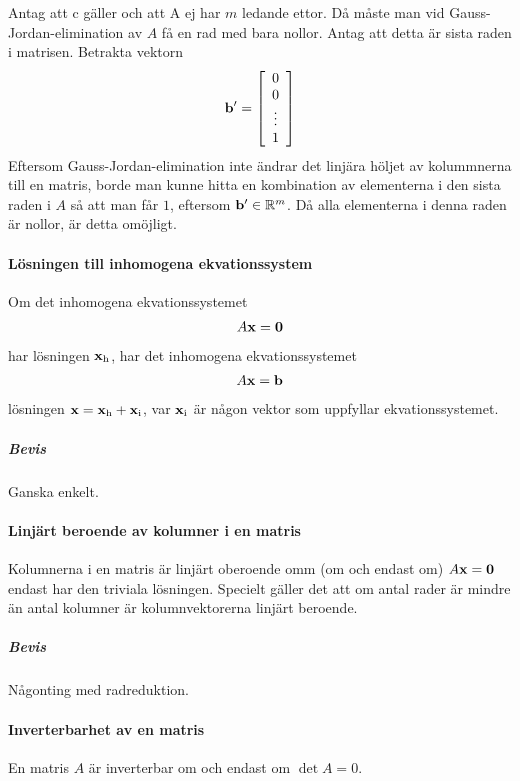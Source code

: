 Antag att c gäller och att A ej har $m$ ledande ettor. Då måste man vid Gauss-Jordan-elimination av $A$ få en rad med bara nollor. Antag att detta är sista raden i matrisen. Betrakta vektorn
\begin{align*}
	\vect{b}' =
	\left[\begin{array}{c}
    	0    \\
    	0    \\
    	\vdots \\
	    1
	\end{array}\right]
\end{align*}
Eftersom Gauss-Jordan-elimination inte ändrar det linjära höljet av kolummnerna till en matris, borde man kunne hitta en kombination av elementerna i den sista raden i $A$ så att man får $1$, eftersom $\vect{b}'\in\R^m$. Då alla elementerna i denna raden är nollor, är detta omöjligt.

\paragraph{Lösningen till inhomogena ekvationssystem}
Om det inhomogena ekvationssystemet
\begin{align*}
	A\vect{x} = \vect{0}
\end{align*}
har lösningen $\vect{x}_\text{h}$, har det inhomogena ekvationssystemet
\begin{align*}
	A\vect{x} = \vect{b}
\end{align*}
lösningen $\vect{x} = \vect{x}_\text{h} + \vect{x}_\text{i}$, var $\vect{x}_\text{i}$ är någon vektor som uppfyllar ekvationssystemet.

\subparagraph{Bevis}
Ganska enkelt.

\paragraph{Linjärt beroende av kolumner i en matris}
Kolumnerna i en matris är linjärt oberoende omm (om och endast om) $A\vect{x} = \vect{0}$ endast har den triviala lösningen. Specielt gäller det att om antal rader är mindre än antal kolumner är kolumnvektorerna linjärt beroende.

\subparagraph{Bevis}
Någonting med radreduktion.

\paragraph{Inverterbarhet av en matris}
En matris $A$ är inverterbar om och endast om $\det A = 0$.

